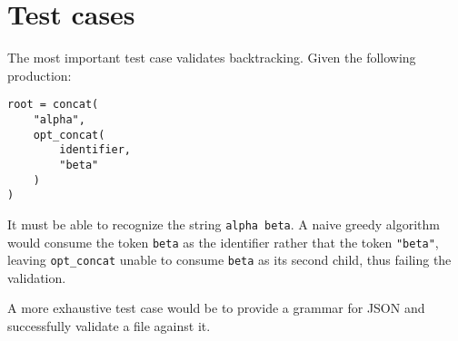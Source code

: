 \documentclass{article}
\begin{document}
	\section{Test cases}

	The most important test case validates backtracking. Given the following
	production:

	\begin{verbatim}root = concat(
    "alpha",
    opt_concat(
        identifier,
        "beta"
    )
)
\end{verbatim}

	It must be able to recognize the string \texttt{alpha beta}. A naive greedy
	algorithm would consume the token \texttt{beta} as the identifier rather
	that the token \texttt{"beta"}, leaving \texttt{opt\_concat} unable to
	consume \texttt{beta} as its second child, thus failing the validation.

	A more exhaustive test case would be to provide a grammar for JSON and
	successfully validate a file against it.
\end{document}
